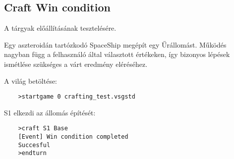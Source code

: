 \documentclass[../../projlab]{subfiles}
\begin{document}
\subsection{Craft Win condition}
\begin{test-case-description}
    A tárgyak előállításának tesztelésére.
\end{test-case-description}
\begin{test-case-function}
    Egy aszteroidán tartózkodó SpaceShip megépít egy Űrállomást. \newline
    Működés nagyban függ a felhasználó által választott értékeken, így bizonyos lépések ismétlése szükséges a várt eredmény eléréséhez.
\end{test-case-function}
\begin{test-case-input}

    A világ betöltése: 
    \begin{verbatim}
    >startgame 0 crafting_test.vsgstd
    \end{verbatim}
    S1 elkezdi az állomás építését:
    \begin{verbatim}
    >craft S1 Base
    [Event] Win condition completed
    Succesful
    >endturn
    \end{verbatim}
\end{test-case-input}
\begin{test-case-output}
\begin{verbatim}
    
    
    
\end{verbatim}
\end{test-case-output}
\end{document}
